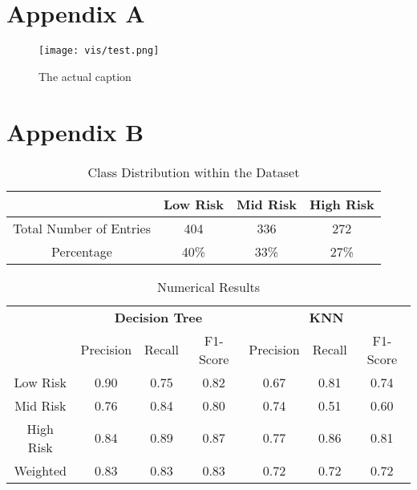 \clearpage
\pagestyle{plain}
\section*{Appendix A}
\begin{figure}[htb]
    \centering
    \texttt{[image: vis/test.png]}
    \caption[List of Figures Caption]{The actual caption}
    \label{abb:boxplots}
\end{figure}

\newpage
\section*{Appendix B}
\begin{table}[h]
    \centering
    \renewcommand{\arraystretch}{1.5}
    \begin{tabular}{cccc}
        & \textbf{Low Risk} & \textbf{Mid Risk} & \textbf{High Risk} \\
        \hline
        Total Number of Entries &  404 & 336 & 272 \\    
        \hline
        Percentage & 40\% & 33\% & 27\%\\
        \hline
    \end{tabular}
    \caption{Class Distribution within the Dataset}
    \label{tab:risk_entries}
\end{table}

\begin{table}[h]
    \centering
    \renewcommand{\arraystretch}{1.5}
    \begin{tabular}{cccc|ccc}
        & \multicolumn{3}{c}{\textbf{Decision Tree}} & \multicolumn{3}{c}{\textbf{KNN}} \\
        \cmidrule(lr){2-4} \cmidrule(lr){5-7}
                & Precision & Recall & F1-Score & Precision & Recall & F1-Score \\
        \hline
        Low Risk &  0.90 & 0.75 & 0.82          & 0.67 & 0.81&0.74 \\
        \hline
        Mid Risk &  0.76 & 0.84 & 0.80          & 0.74& 0.51& 0.60\\
        \hline
        High Risk & 0.84 & 0.89 & 0.87          & 0.77& 0.86&0.81 \\
        \hline
        Weighted & 0.83 & 0.83 & 0.83           & 0.72 & 0.72 & 0.72 \\
        \hline
    \end{tabular}
    \caption{Numerical Results}
    \label{tab:numercial}
\end{table}
